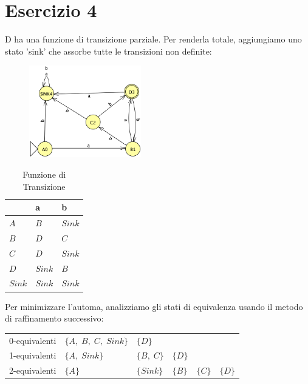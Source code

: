 \documentclass[11pt]{article}
\begin{document}
\section*{Esercizio 4}
\cal D ha una funzione di transizione parziale. Per renderla totale, aggiungiamo uno stato 'sink' che assorbe tutte le transizioni non definite:

\begin{multicols}{2}
  \begin{figure}[H]
    \centering
    \includegraphics[height=4cm]{img/04DFAsink.png}
    \label{fig:04-DFA-sink}
  \end{figure}
  
  \begin{table}[H]
    \centering
    \begin{tabularx}{\linewidth}{|>{\centering\arraybackslash}X|>{\centering\arraybackslash}X|>{\centering\arraybackslash}X|}
    \hline
    & \textbf{a} & \textbf{b}  \\
    \hline
    $A$ & $B$ & $Sink$ \\
    \hline
    $B$ & $D$ & $C$ \\
    \hline
    $C$ & $D$ & $Sink$ \\
    \hline
    $D$ & $Sink$ & $B$ \\
    \hline
    $Sink$ & $Sink$ & $Sink$ \\
    \hline
    \end{tabularx}
    \label{tab:04-funzione-transazione}
    \caption*{\small Funzione di Transizione}
  \end{table}
\end{multicols}

\noindent Per minimizzare l'automa, analizziamo gli stati di equivalenza usando il metodo di raffinamento successivo:

\begin{table}[H]
  \small
  \centering
  \begin{tabularx}{\linewidth}{l l l l l l}
  0-equivalenti & $\{A,\;B,\;C,\;Sink\}$ & $\{D\}$ & & & \\
  1-equivalenti & $\{A,\;Sink\}$ & $\{B,\;C\}$ & $\{D\}$ & & \\
  2-equivalenti & $\{A\}$ & $\{Sink\}$ & $\{B\}$ & $\{C\}$ & $\{D\}$ \\
  \end{tabularx}
  \label{tab:04-partition-refinment}
\end{table}
\end{document}
